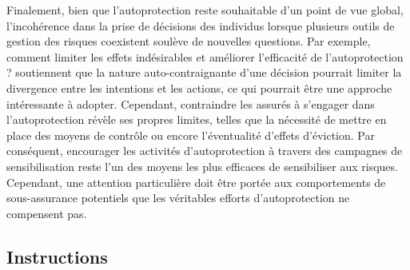 \begin{Article}
\begin{refsection}[Mouminoux]
Finalement, bien que l'autoprotection reste souhaitable d'un point de vue global, l'incohérence dans la prise de décisions des individus lorsque plusieurs outils de gestion des risques coexistent soulève de nouvelles questions. Par exemple, comment limiter les effets indésirables et améliorer l'efficacité de l'autoprotection ? \textcite{ArielyWertenbroch2002} soutiennent que la nature auto-contraignante d'une décision pourrait limiter la divergence entre les intentions et les actions, ce qui pourrait être une approche intéressante à adopter. Cependant, contraindre les assurés à s'engager dans l'autoprotection révèle ses propres limites, telles que la nécessité de mettre en place des moyens de contrôle ou encore l'éventualité d'effets d'éviction. Par conséquent, encourager les activités d'autoprotection à travers des campagnes de sensibilisation reste l'un des moyens les plus efficaces de sensibiliser aux risques. Cependant, une attention particulière doit être portée aux comportements de sous-assurance potentiels que les véritables efforts d'autoprotection ne compensent pas.

\printbibliography

\begin{appendices}
  
\section{Instructions}
\label{Annexe:Instruction}


\end{appendices}
\end{refsection}
\end{Article}
